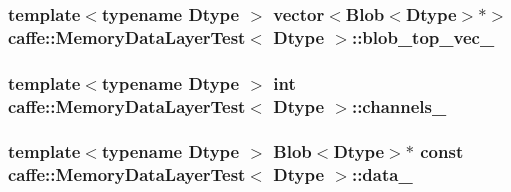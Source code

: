 \hypertarget{classcaffe_1_1_memory_data_layer_test_ac33a7be28ca9fd66a9981645de4b4423}{
\subsubsection[{blob\+\_\+top\+\_\+vec\+\_\+}]{\setlength{\rightskip}{0pt plus 5cm}template$<$typename Dtype $>$ vector$<${\bf Blob}$<$Dtype$>$$\ast$$>$ {\bf caffe\+::\+Memory\+Data\+Layer\+Test}$<$ Dtype $>$\+::blob\+\_\+top\+\_\+vec\+\_\+\hspace{0.3cm}{\ttfamily [protected]}}}\label{classcaffe_1_1_memory_data_layer_test_ac33a7be28ca9fd66a9981645de4b4423}
\hypertarget{classcaffe_1_1_memory_data_layer_test_a12cc813a56e6ed0f8f9a341f37adb87b}{
\subsubsection[{channels\+\_\+}]{\setlength{\rightskip}{0pt plus 5cm}template$<$typename Dtype $>$ int {\bf caffe\+::\+Memory\+Data\+Layer\+Test}$<$ Dtype $>$\+::channels\+\_\+\hspace{0.3cm}{\ttfamily [protected]}}}\label{classcaffe_1_1_memory_data_layer_test_a12cc813a56e6ed0f8f9a341f37adb87b}
\hypertarget{classcaffe_1_1_memory_data_layer_test_ad0a921772812e73a2039abb85ffe9968}{
\subsubsection[{data\+\_\+}]{\setlength{\rightskip}{0pt plus 5cm}template$<$typename Dtype $>$ {\bf Blob}$<$Dtype$>$$\ast$ const {\bf caffe\+::\+Memory\+Data\+Layer\+Test}$<$ Dtype $>$\+::data\+\_\+\hspace{0.3cm}{\ttfamily [protected]}}}\label{classcaffe_1_1_memory_data_layer_test_ad0a921772812e73a2039abb85ffe9968}
